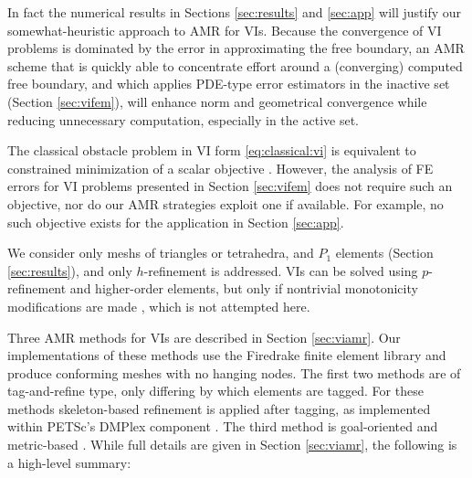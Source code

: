 \documentclass[]{interact}
\theoremstyle{plain}%
\theoremstyle{definition}
\theoremstyle{remark}
\begin{document}
In fact the numerical results in Sections \ref{sec:results} and \ref{sec:app} will justify our somewhat-heuristic approach to AMR for VIs.  Because the convergence of VI problems is dominated by the error in approximating the free boundary, an AMR scheme that is quickly able to concentrate effort around a (converging) computed free boundary, and which applies PDE-type error estimators in the inactive set (Section \ref{sec:vifem}), will enhance norm and geometrical convergence while reducing unnecessary computation, especially in the active set.

The classical obstacle problem in VI form \eqref{eq:classical:vi} is equivalent to constrained minimization of a scalar objective \cite{KinderlehrerStampacchia1980}.  However, the analysis of FE errors for VI problems presented in Section \ref{sec:vifem} does not require such an objective, nor do our AMR strategies exploit one if available.  For example, no such objective exists for the application in Section \ref{sec:app}.

We consider only meshs of triangles or tetrahedra, and $P_1$ elements (Section \ref{sec:results}), and only $h$-refinement is addressed.  VIs can be solved using $p$-refinement and higher-order elements, but only if nontrivial monotonicity modifications are made \cite{KeithSurowiec2024}, which is not attempted here.

Three AMR methods for VIs are described in Section \ref{sec:viamr}.  Our implementations of these methods use the Firedrake finite element library and produce conforming meshes with no hanging nodes.  The first two methods are of tag-and-refine type, only differing by which elements are tagged.  For these methods skeleton-based refinement \cite{PlazaCarey2000} is applied after tagging, as implemented within PETSc's DMPlex component \cite{petsc-user-ref}.  The third method is goal-oriented and metric-based \cite{Wallworketal2020}.  While full details are given in Section \ref{sec:viamr}, the following is a high-level summary:
\end{document}
